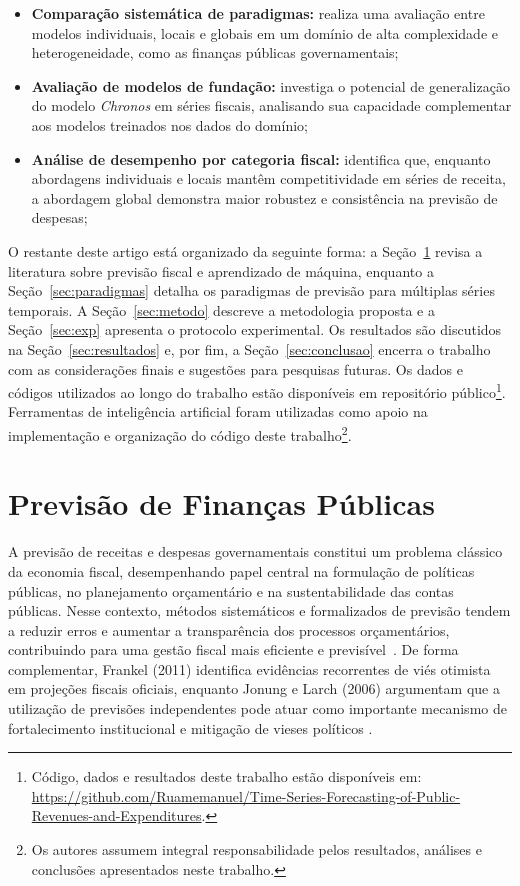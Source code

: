 \documentclass[12pt]{article}
\begin{document}
\begin{itemize}
    \item \textbf{Comparação sistemática de paradigmas:} realiza uma avaliação entre modelos individuais, locais e globais em um domínio de alta complexidade e heterogeneidade, como as finanças públicas governamentais;
    \item \textbf{Avaliação de modelos de fundação:} investiga o potencial de generalização do modelo \textit{Chronos} em séries fiscais, analisando sua capacidade complementar aos modelos treinados nos dados do domínio;
    \item \textbf{Análise de desempenho por categoria fiscal:} identifica que, enquanto abordagens individuais e locais mantêm competitividade em séries de receita, a abordagem global demonstra maior robustez e consistência na previsão de despesas;
\end{itemize}

O restante deste artigo está organizado da seguinte forma: a Seção~\ref{sec:financas} revisa a literatura sobre previsão fiscal e aprendizado de máquina, enquanto a Seção~\ref{sec:paradigmas} detalha os paradigmas de previsão para múltiplas séries temporais. A Seção~\ref{sec:metodo} descreve a metodologia proposta e a Seção~\ref{sec:exp} apresenta o protocolo experimental. Os resultados são discutidos na Seção~\ref{sec:resultados} e, por fim, a Seção~\ref{sec:conclusao} encerra o trabalho com as considerações finais e sugestões para pesquisas futuras. Os dados e códigos utilizados ao longo do trabalho estão disponíveis em repositório público\footnote{Código, dados e resultados deste trabalho estão disponíveis em: \url{https://github.com/Ruamemanuel/Time-Series-Forecasting-of-Public-Revenues-and-Expenditures}.}. Ferramentas de inteligência artificial foram utilizadas como apoio na implementação e organização do código deste trabalho\footnote{Os autores assumem integral responsabilidade pelos resultados, análises e conclusões apresentados neste trabalho.}.

\section{Previsão de Finanças Públicas}
\label{sec:financas}

A previsão de receitas e despesas governamentais constitui um problema clássico da economia fiscal, desempenhando papel central na formulação de políticas públicas, no planejamento orçamentário e na sustentabilidade das contas públicas. Nesse contexto, métodos sistemáticos e formalizados de previsão tendem a reduzir erros e aumentar a transparência dos processos orçamentários, contribuindo para uma gestão fiscal mais eficiente e previsível~\cite{buettner2010revenue}. De forma complementar, Frankel (2011) identifica evidências recorrentes de viés otimista em projeções fiscais oficiais, enquanto Jonung e Larch (2006) argumentam que a utilização de previsões independentes pode atuar como importante mecanismo de fortalecimento institucional e mitigação de vieses políticos \cite{frankel2011over,jonung2006fiscal}.
\end{document}
